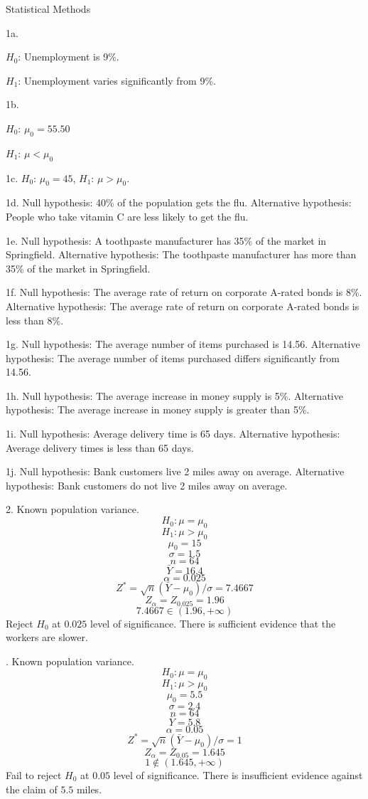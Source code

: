 \parindent=0pt

Statistical Methods

\bigskip
1a.\par
$H_0$: Unemployment is 9\%.\par
$H_1$: Unemployment varies significantly from 9\%.

\bigskip
1b.\par
$H_0$: $\mu_0=55.50$\par
$H_1$: $\mu<\mu_0$

\bigskip
1c. $H_0$: $\mu_0=45$, $H_1$: $\mu>\mu_0$.

\bigskip
1d.
Null hypothesis: 40\% of the population gets the flu.
Alternative hypothesis: People who take vitamin C are less likely to
get the flu.

\bigskip
1e.
Null hypothesis: A toothpaste manufacturer has 35\% of the
market in Springfield.
Alternative hypothesis:
The toothpaste manufacturer has more than 35\% of the market in
Springfield.

\bigskip
1f.
Null hypothesis:
The average rate of return on corporate A-rated bonds is 8\%.
Alternative hypothesis:
The average rate of return on corporate A-rated bonds is less than 8\%.

\bigskip
1g.
Null hypothesis:
The average number of items purchased is 14{.}56.
Alternative hypothesis:
The average number of items purchased differs significantly from 14{.}56.

\bigskip
1h.
Null hypothesis:
The average increase in money supply is 5\%.
Alternative hypothesis:
The average increase in money supply is greater than 5\%.

\bigskip
1i.
Null hypothesis:
Average delivery time is 65 days.
Alternative hypothesis:
Average delivery times is less than 65 days.

\bigskip
1j.
Null hypothesis:
Bank customers live 2 miles away on average.
Alternative hypothesis:
Bank customers do not live 2 miles away on average.

\vfill
\eject

2. Known population variance.
$$H_0: \mu=\mu_0$$
$$H_1: \mu>\mu_0$$
$$\mu_0=15$$
$$\sigma=1.5$$
$$n=64$$
$$\bar Y=16.4$$
$$\alpha=0.025$$
$$Z^*=\sqrt n(\bar Y-\mu_0)/\sigma=7.4667$$
$$Z_\alpha=Z_{0.025}=1.96$$
$$7.4667\in(1.96,+\infty)$$
Reject $H_0$ at $0.025$ level of significance.
There is sufficient evidence that the workers are slower.

. Known population variance.
$$H_0: \mu=\mu_0$$
$$H_1: \mu>\mu_0$$
$$\mu_0=5.5$$
$$\sigma=2.4$$
$$n=64$$
$$\bar Y=5.8$$
$$\alpha=0.05$$
$$Z^*=\sqrt n(\bar Y-\mu_0)/\sigma=1$$
$$Z_\alpha=Z_{0.05}=1.645$$
$$1\not\in(1.645,+\infty)$$
Fail to reject $H_0$ at $0.05$ level of significance.
There is insufficient evidence against the claim of $5.5$ miles.

